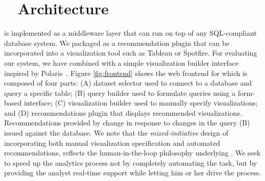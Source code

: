 
\section{{\large \SeeDB\ } Architecture}
\label{sec:system_architecture}

\SeeDB is implemented as a middleware layer that can run on
top of any SQL-compliant database system. 
We packaged \SeeDB as a recommendation plugin that can
be incorporated into a visualization tool such as Tableau or Spotfire. 
For evaluating our system, we have combined \SeeDB with a simple visualization
builder interface inspired by Polaris~\cite{polaris}.
Figure \ref{fig:frontend} shows the web frontend for \SeeDB which is composed
of four parts:
(A) dataset selector used to
connect to a database and query a specific table; (B) query builder used to
formulate queries using a form-based interface; (C) visualization builder
used to manually specify visualizations; and (D) \SeeDB recommendations plugin
that displays recommended visualizations.
Recommendations provided by \SeeDB change in response to changes in the query (B)
issued against the database.
We note that the {\em mixed-initiative} design of \SeeDB incorporating both manual
visualization specification and automated recommendations, reflects the
human-in-the-loop philosophy underlying \SeeDB.
We seek to speed up the analytics process not by completely automating the task, but
by providing the analyst real-time support while letting him or her drive the process.

